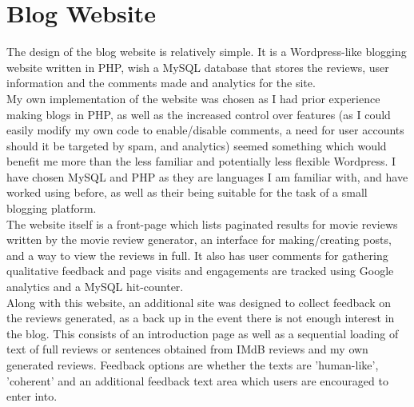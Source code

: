 \section{Blog Website}
The design of the blog website is relatively simple. It is a Wordpress-like blogging website written in PHP, wish a MySQL database that stores the reviews, user information and the comments made and analytics for the site.\\
My own implementation of the website was chosen as I had prior experience making blogs in PHP, as well as the increased control over features (as I could easily modify my own code to enable/disable comments, a need for user accounts should it be targeted by spam, and analytics) seemed something which would benefit me more than the less familiar and potentially less flexible Wordpress.
I have chosen MySQL and PHP as they are languages I am familiar with, and have worked using before, as well as their being suitable for the task of a small blogging platform.\\
The website itself is a front-page which lists paginated results for movie reviews written by the movie review generator, an interface for making/creating posts, and a way to view the reviews in full. It also has user comments for gathering qualitative feedback and page visits and engagements are tracked using Google analytics and a MySQL hit-counter.\\
Along with this website, an additional site was designed to collect feedback on the reviews generated, as a back up in the event there is not enough interest in the blog. This consists of an introduction page as well as a sequential loading of text of full reviews or sentences obtained from IMdB reviews and my own generated reviews. Feedback options are whether the texts are 'human-like', 'coherent' and an additional feedback text area which users are encouraged to enter into.

